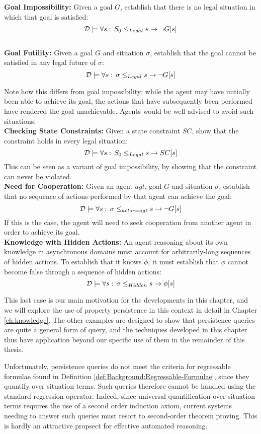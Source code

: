 \textbf{Goal Impossibility:} Given a goal $G$, establish that there
is no legal situation in which that goal is satisfied:\[
\mathcal{D}\models\forall s:\, S_{0}\leq_{Legal}s\rightarrow\neg G[s]\]
\\


\textbf{Goal Futility:} Given a goal $G$ and situation $\sigma$,
establish that the goal cannot be satisfied in any legal future of
$\sigma$:\[
\mathcal{D}\models\forall s:\,\sigma\leq_{Legal}s\rightarrow\neg G[s]\]


Note how this differs from goal impossibility: while the agent may
have initially been able to achieve its goal, the actions that have
subsequently been performed have rendered the goal unachievable. Agents
would be well advised to avoid such situations.\\


\textbf{Checking State Constraints:} Given a state constraint $SC$,
show that the constraint holds in every legal situation:\[
\mathcal{D}\models\forall s:\, S_{0}\leq_{Legal}s\rightarrow SC[s]\]
This can be seen as a variant of goal impossibility, by showing that
the constraint can never be violated.\\


\textbf{Need for Cooperation:} Given an agent $agt$, goal $G$ and
situation $\sigma$, establish that no sequence of actions performed
by that agent can achieve the goal:\[
\mathcal{D}\models\forall s:\,\sigma\leq_{actor=agt}s\rightarrow\neg G[s]\]
 If this is the case, the agent will need to seek cooperation from
another agent in order to achieve its goal.\\


\textbf{Knowledge with Hidden Actions:} An agent reasoning about its
own knowledge in asynchronous domains must account for arbitrarily-long
sequences of hidden actions. To establish that it knows $\phi$, it
must establish that $\phi$ cannot become false through a sequence
of hidden actions:\[
\mathcal{D}\models\forall s:\,\sigma\leq_{Hidden}s\rightarrow\phi[s]\]


This last case is our main motivation for the developments in this
chapter, and we will explore the use of property persistence in this
context in detail in Chapter \ref{ch:knowledge}. The other examples
are designed to show that persistence queries are quite a general
form of query, and the techniques developed in this chapter thus have
application beyond our specific use of them in the remainder of this
thesis.

Unfortunately, persistence queries do not meet the criteria for regressable
formulae found in Definition \ref{def:Background:Regressable-Formulae},
since they quantify over situation terms. Such queries therefore cannot
be handled using the standard regression operator. Indeed, since universal
quantification over situation terms requires the use of a second order
induction axiom, current systems needing to answer such queries must
resort to second-order theorem proving. This is hardly an attractive
propsect for effective automated reasoning.


